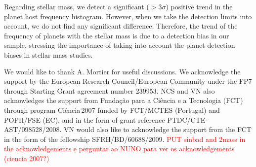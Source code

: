 \documentclass[structabstract]{aa}
\begin{document}
Regarding stellar mass, we detect a significant ($>3\sigma$) positive trend in the planet host frequency histogram. However, when we take the detection limits into account, we do not find any significant difference. Therefore, the trend of the frequency of planets with the stellar mass is due to a detection bias in our sample, stressing the importance of taking into account the planet detection biases in stellar mass studies.








\begin{acknowledgements}
We would like to thank A. Mortier for useful discussions. We acknowledge the
support by the European Research Council/European Community under the
FP7 through Starting Grant agreement number 239953. NCS and VN also
acknowledges the support from Funda\c{c}\~ao para a Ci\^encia e a
Tecnologia (FCT) through program Ci\^encia\,2007 funded by FCT/MCTES
(Portugal) and POPH/FSE (EC), and in the form of grant reference
PTDC/CTE-AST/098528/2008. VN would also like to acknowledge the
support from the FCT in the form of the fellowship SFRH/BD/60688/2009. 
\textcolor{red}{PUT sinbad and 2mass in the acknowledgements e perguntar ao NUNO para ver os acknowledgements (ciencia 2007?)}      


\end{acknowledgements}
\end{document}
